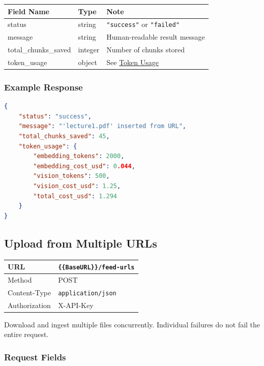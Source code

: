 \documentclass[11pt]{article}
\begin{document}
\begin{longtable}{|p{4cm}|p{2cm}|p{8.7cm}|}
  \hline
  \rowcolor{tabheader}
  \textbf{Field Name} & \textbf{Type} & \textbf{Note} \\
  \hline
  \endhead
  status               & string  & \texttt{"success"} or \texttt{"failed"} \\
  \hline
  message              & string  & Human-readable result message \\
  \hline
  total\_chunks\_saved & integer & Number of chunks stored \\
  \hline
  token\_usage         & object  & See \hyperref[sec:tokenusage]{Token Usage} \\
  \hline
\end{longtable}

\subsubsection{Example Response}

\begin{lstlisting}[language=json]
{
    "status": "success",
    "message": "'lecture1.pdf' inserted from URL",
    "total_chunks_saved": 45,
    "token_usage": {
        "embedding_tokens": 2000,
        "embedding_cost_usd": 0.044,
        "vision_tokens": 500,
        "vision_cost_usd": 1.25,
        "total_cost_usd": 1.294
    }
}
\end{lstlisting}

\subsection{Upload from Multiple URLs}

\begin{tabular}{|H{3cm}|p{12.1cm}|}
  \hline
  URL           & \texttt{\{\{BaseURL\}\}/feed-urls} \\
  \hline
  Method        & POST \\
  \hline
  Content-Type  & \texttt{application/json} \\
  \hline
  Authorization & X-API-Key \\
  \hline
\end{tabular}

Download and ingest multiple files concurrently. Individual failures do not
fail the entire request.

\subsubsection{Request Fields}
\end{document}
